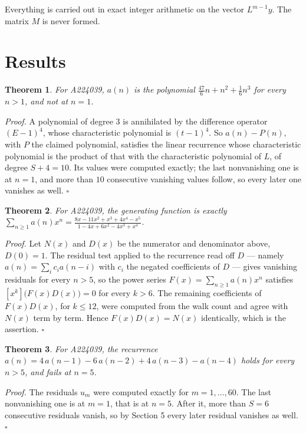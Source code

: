 \documentclass[11pt]{article}
\newtheorem{theorem}{Theorem}
\theoremstyle{definition}
\begin{document}
Everything is carried out in exact integer arithmetic on the vector $L^{m-1}y$. The matrix $M$ is never formed.

\section{Results}

\begin{theorem} For A224039, $a(n)$ is the polynomial $\frac{47}{6}n + n^{2} + \frac{1}{6}n^{3}$ for every $n > 1$, and not at $n = 1$.\end{theorem}

{\itshape Proof.} A polynomial of degree $3$ is annihilated by the difference operator $(E-1)^{4}$, whose characteristic polynomial is $(t-1)^{4}$. So $a(n) - P(n)$, with $P$ the claimed polynomial, satisfies the linear recurrence whose characteristic polynomial is the product of that with the characteristic polynomial of $L$, of degree $S + 4 = 10$. Its values were computed exactly; the last nonvanishing one is at $n = 1$, and more than $10$ consecutive vanishing values follow, so every later one vanishes as well. $\square$

\begin{theorem} For A224039, the generating function is exactly $\sum_{n\ge 1} a(n)x^n = \frac{8x - 11x^{2} + x^{3} + 4x^{4} - x^{5}}{1 - 4x + 6x^{2} - 4x^{3} + x^{4}}$.\end{theorem}

{\itshape Proof.} Let $N(x)$ and $D(x)$ be the numerator and denominator above, $D(0)=1$. The residual test applied to the recurrence read off $D$ --- namely $a(n) = \sum_i c_i a(n-i)$ with $c_i$ the negated coefficients of $D$ --- gives vanishing residuals for every $n > 5$, so the power series $F(x)=\sum_{n\ge 1}a(n)x^n$ satisfies $[x^k]\bigl(F(x)D(x)\bigr) = 0$ for every $k > 6$. The remaining coefficients of $F(x)D(x)$, for $k \le 12$, were computed from the walk count and agree with $N(x)$ term by term. Hence $F(x)D(x) = N(x)$ identically, which is the assertion. $\square$

\begin{theorem} For A224039, the recurrence $a(n) = 4\,a(n-1) - 6\,a(n-2) + 4\,a(n-3) - a(n-4)$ holds for every $n > 5$, and fails at $n = 5$.\end{theorem}

{\itshape Proof.} The residuals $u_m$ were computed exactly for $m = 1,\dots,60$. The last nonvanishing one is at $m = 1$, that is at $n = 5$. After it, more than $S = 6$ consecutive residuals vanish, so by Section 5 every later residual vanishes as well. $\square$
\end{document}
